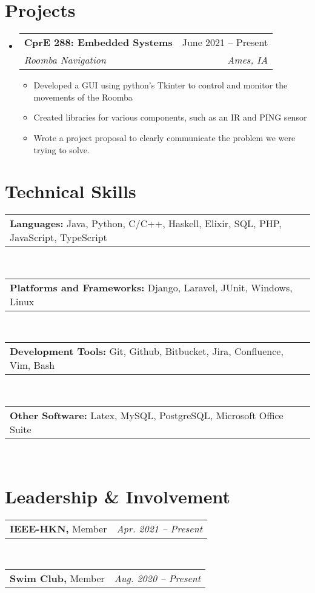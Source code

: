 \documentclass[letterpaper,12pt]{article}
\makeatletter
\newcommand{\resumeItem}[1]{
  \item\small{
    {#1 \vspace{-2pt}}
  }
}
\newcommand{\resumeSubheading}[4]{
  \vspace{2pt}\item
    \begin{tabular*}{0.97\textwidth}[t]{l@{\extracolsep{\fill}}r}
      \textbf{#1} & #2 \\
      \textit{\small#3} & \textit{\small #4} \\
    \end{tabular*}\vspace{-7pt}
}
\newcommand{\myresumeSubSubheading}[3]{
    \item
    \begin{tabular*}{0.97\textwidth}{l@{\extracolsep{\fill}}r}
      \textbf{\small#1} {\small #2} & \textit{\small #3} \\
    \end{tabular*}\vspace{-7pt}
}
\newcommand{\resumeSubHeadingListStart}{\vspace{2pt}\begin{itemize}[leftmargin=0.15in, label={}]}
\newcommand{\resumeSubHeadingListEnd}{\end{itemize}}
\newcommand{\resumeItemListStart}{\begin{itemize}}
\newcommand{\resumeItemListEnd}{\end{itemize}\vspace{-5pt}}
\makeatother
\begin{document}
\section{Projects}
    \resumeSubHeadingListStart
    \resumeSubheading
      {CprE 288: Embedded Systems}{June 2021 -- Present}
      {Roomba Navigation}{Ames, IA}
      \resumeItemListStart
        \resumeItem{Developed a GUI using python's Tkinter to control and monitor the movements of the Roomba}
        \resumeItem{Created libraries for various components, such as an IR and PING sensor}
        \resumeItem{Wrote a project proposal to clearly communicate the problem we were trying to solve.}
      \resumeItemListEnd
    \resumeSubHeadingListEnd



\section{Technical Skills}
 \begin{itemize}[leftmargin=0.15in, label={}]
    \small{
     \myresumeSubSubheading{Languages:}{Java, Python, C/C++, Haskell, Elixir, SQL, PHP, JavaScript, TypeScript}{} \\
     \myresumeSubSubheading{Platforms and Frameworks:}{Django, Laravel, JUnit, Windows, Linux}{} \\
     \myresumeSubSubheading{Development Tools:}{Git, Github, Bitbucket, Jira, Confluence, Vim, Bash }{} \\
     \myresumeSubSubheading{Other Software:}{Latex, MySQL, PostgreSQL, Microsoft Office Suite}{} \\
    }
 \end{itemize}
 

\section{Leadership \& Involvement}
\begin{itemize}[leftmargin=0.15in, label={}]
    \small{
    \myresumeSubSubheading{IEEE-HKN,}{Member}{Apr. 2021 -- Present} \\
    \myresumeSubSubheading{Swim Club,}{Member}{Aug. 2020 -- Present}

    }
 \end{itemize}
\end{document}
